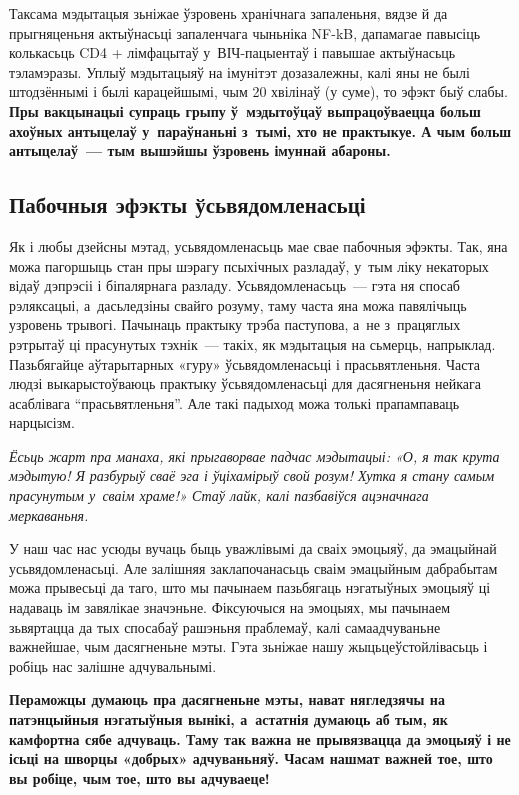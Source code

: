 Таксама мэдытацыя зьніжае ўзровень хранічнага запаленьня, вядзе й да прыгняценьня актыўнасьці запаленчага чыньніка NF-kB, дапамагае павысіць колькасьць CD4 + лімфацытаў у~ВІЧ-пацыентаў і павышае актыўнасьць тэламэразы. Уплыў мэдытацыяў на імунітэт дозазалежны, калі яны не былі штодзённымі і былі карацейшымі, чым 20 хвілінаў (у суме), то эфэкт быў слабы. \textbf{Пры вакцынацыі супраць грыпу ў~мэдытоўцаў выпрацоўваецца больш ахоўных антыцелаў у~параўнаньні з~тымі, хто не практыкуе. А чым больш антыцелаў~--- тым вышэйшы ўзровень імуннай абароны.}

\subsection*{Пабочныя эфэкты ўсьвядомленасьці}

Як і любы дзейсны мэтад, усьвядомленасьць мае свае пабочныя эфэкты. Так, яна можа пагоршыць стан пры шэрагу псыхічных разладаў, у~тым ліку некаторых відаў дэпрэсіі і біпалярнага разладу. Усьвядомленасьць~--- гэта ня спосаб рэляксацыі, а~дасьледзіны свайго розуму, таму часта яна можа павялічыць узровень трывогі. Пачынаць практыку трэба паступова, а~не з~працяглых рэтрытаў ці прасунутых тэхнік~--- такіх, як мэдытацыя на сьмерць, напрыклад. Пазьбягайце аўтарытарных «гуру» ўсьвядомленасьці і прасьвятленьня. Часта людзі выкарыстоўваюць практыку ўсьвядомленасьці для дасягненьня нейкага асаблівага ``прасьвятленьня''. Але такі падыход можа толькі прапампаваць нарцысізм.

\emph{Ёсьць жарт пра манаха, які прыгаворвае падчас мэдытацыі: «О, я так крута мэдытую! Я разбурыў сваё эга і ўціхамірыў свой розум! Хутка я стану самым прасунутым у~сваім храме!» Стаў лайк, калі пазбавіўся ацэначнага меркаваньня.}

У наш час нас усюды вучаць быць уважлівымі да сваіх эмоцыяў, да эмацыйнай усьвядомленасьці. Але залішняя заклапочанасьць сваім эмацыйным дабрабытам можа прывесьці да таго, што мы пачынаем пазьбягаць нэгатыўных эмоцыяў ці надаваць ім завялікае значэньне. Фіксуючыся на эмоцыях, мы пачынаем зьвяртацца да тых спосабаў рашэньня праблемаў, калі самаадчуваньне важнейшае, чым дасягненьне мэты. Гэта зьніжае нашу жыцьцеўстойлівасьць і робіць нас залішне адчувальнымі.

\textbf{Пераможцы думаюць пра дасягненьне мэты, нават нягледзячы на патэнцыйныя нэгатыўныя вынікі, а~астатнія думаюць аб тым, як камфортна сябе адчуваць. Таму так важна не прывязвацца да эмоцыяў і не ісьці на шворцы «добрых» адчуваньняў. Часам нашмат важней тое, што вы робіце, чым тое, што вы адчуваеце!}

